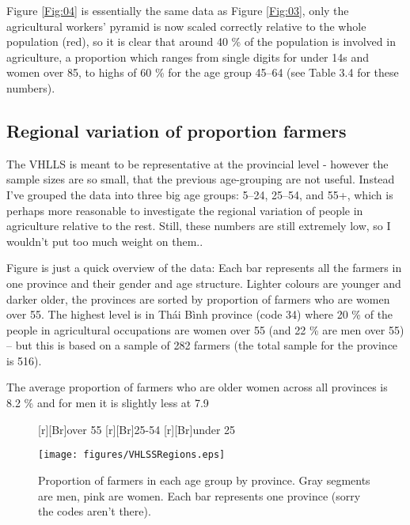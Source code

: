 \documentclass{article}
\begin{document}
Figure \ref{Fig:04} is essentially  the same data as Figure \ref{Fig:03}, only the agricultural workers' pyramid is now scaled correctly relative to the whole population (red), so it is clear that around 40 \% of the population is involved in agriculture, a proportion which ranges from single digits for under 14s and women over 85, to highs of 60 \% for the age group 45--64 (see Table 3.4 for these numbers).  

\subsection{Regional variation of proportion farmers}\label{Sec:VAll}

The VHLLS is meant to be representative at the provincial level - however the sample sizes are so small, that the previous age-grouping are not useful. Instead I've grouped the data into three big age groups: 5--24, 25--54, and 55+, which is perhaps more reasonable to investigate the regional variation of people in agriculture relative to the rest. Still, these numbers are still extremely low, so I wouldn't put too much weight on them.. 

Figure \label{Fig:05} is just a quick overview of the data: Each bar represents all the farmers in one province and their gender and age structure. Lighter colours are younger and darker older, the provinces are sorted by proportion of farmers who are women over 55. The highest level is in Thái Bình province (code 34) where 20 \% of the people in agricultural occupations are women over 55 (and 22 \% are men over 55) -- but this is based on a sample of 282 farmers (the total sample for the province is 516). 

The average proportion of farmers who are older women across all provinces is 8.2 \% and for men it is slightly less at 7.9

 
\begin{figure}[htbp!]
[r][Br]{\scriptsize{over 55}}
[r][Br]{\scriptsize{25-54}}
[r][Br]{\scriptsize{under 25}}

\texttt{[image: figures/VHLSSRegions.eps]}
\caption{Proportion of farmers in each age group by province. Gray segments are men, pink are women. Each bar represents one province (sorry the codes aren't there). }\label{Fig:05}
\end{figure}
\end{document}

